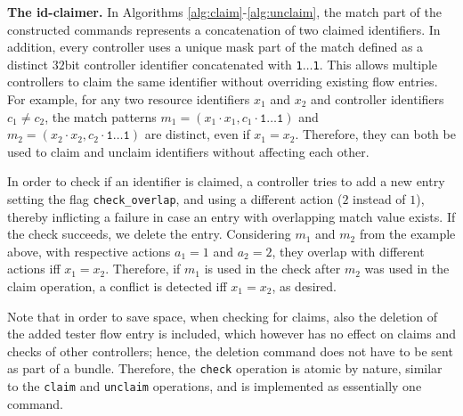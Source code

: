 \documentclass[conference]{sigcomm-alternate}
\newcommand{\concat}[0]{\cdot}
\newcommand{\claimcheck}{check\xspace}
\newcommand{\checko}{\texttt{check\_overlap}\xspace}
\begin{document}
\vspace{1mm}
\noindent\textbf{The id-claimer.}
%
In Algorithms \ref{alg:claim}-\ref{alg:unclaim},
the match part of the constructed commands represents a concatenation
of two claimed identifiers.
In addition, every controller uses a unique mask part of the match
defined as a distinct $32$bit controller identifier concatenated with
\texttt{1$\ldots$1}.
This allows multiple controllers to claim the same identifier without
overriding existing flow entries.
%
For example, for any two resource identifiers $x_1$ and $x_2$ and controller identifiers $c_1\neq c_2$,
the match patterns $m_1=(x_1\concat x_1, c_1\concat \texttt{1$\ldots$1})$ and $ m_2=(x_2\concat x_2, c_2\concat \texttt{1$\ldots$1})$ are distinct,
even if $x_1=x_2$.
Therefore, they can both be used to claim and unclaim identifiers without affecting each other.

In order to check if an identifier is claimed, a controller tries to add 
a new entry setting the flag \texttt{\checko}, and using a different
action ($2$ instead of $1$),
thereby inflicting a failure in case an entry with overlapping match value exists.
If the check succeeds, we delete the entry.
Considering $m_1$ and $m_2$ from the example above,
with respective actions $a_1=1$ and $a_2=2$,  they overlap
with different actions iff $x_1=x_2$. Therefore, if $m_1$ is used in the \claimcheck after $m_2$ was used in the claim operation,
a conflict is detected iff $x_1=x_2$, as desired.

Note that in order to save space, when checking for claims, also the deletion of the added tester flow entry is included,
which however has no effect on claims and checks of other controllers; hence, the deletion command does not
have to be sent as part of a bundle. Therefore, the \texttt{\claimcheck} operation is atomic by nature,
similar to the \texttt{claim} and \texttt{unclaim} operations, and is implemented as essentially one command.

\end{document}
